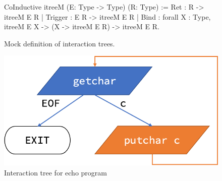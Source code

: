 \begin{figure}
\begin{coq}
  CoInductive itreeM (E: Type -> Type) (R: Type) :=
    Ret     : R   -> itreeM E R
  | Trigger : E R -> itreeM E R
  | Bind    : forall {X : Type}, itreeM E X -> (X -> itreeM E R) -> itreeM E R.
\end{coq}
\vspace*{1em}
\caption{Mock definition of interaction trees.}
\label{fig:mock-itree}
\end{figure}

\begin{figure}
\vspace*{1em}
  \includegraphics[width=.5\linewidth]{figures/echo-itree}
  \caption{Interaction tree for echo program}
  \label{fig:echo-itree}
\end{figure}

